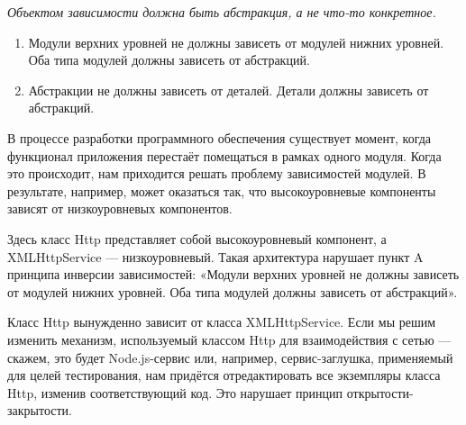 \documentclass[a4paper]{article}
\begin{document}
\textit{Объектом зависимости должна быть абстракция, а не что-то конкретное.}

\begin{enumerate}
  \item Модули верхних уровней не должны зависеть от модулей нижних уровней. Оба типа модулей должны зависеть от абстракций.

  \item Абстракции не должны зависеть от деталей. Детали должны зависеть от абстракций.
\end{enumerate}

В процессе разработки программного обеспечения существует момент, когда функционал приложения перестаёт помещаться в рамках одного модуля. Когда это происходит, нам приходится решать проблему зависимостей модулей. В результате, например, может оказаться так, что высокоуровневые компоненты зависят от низкоуровневых компонентов.

\begin{figure}[h]
\end{figure}

Здесь класс Http представляет собой высокоуровневый компонент, а XMLHttpService — низкоуровневый. Такая архитектура нарушает пункт A принципа инверсии зависимостей: «Модули верхних уровней не должны зависеть от модулей нижних уровней. Оба типа модулей должны зависеть от абстракций».

Класс Http вынужденно зависит от класса XMLHttpService. Если мы решим изменить механизм, используемый классом Http для взаимодействия с сетью — скажем, это будет Node.js-сервис или, например, сервис-заглушка, применяемый для целей тестирования, нам придётся отредактировать все экземпляры класса Http, изменив соответствующий код. Это нарушает принцип открытости-закрытости.
\end{document}
